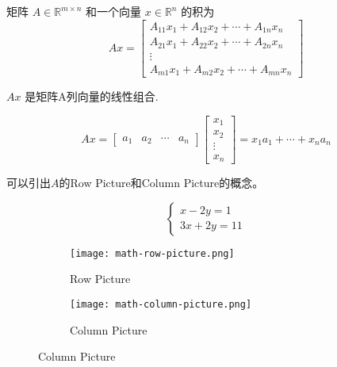 \begin{definition}[矩阵-向量乘积 $Ax$]
    矩阵 $ A \in \mathbb{R}^{m \times n} $ 和一个向量 $ x \in \mathbb{R}^{n} $ 的积为
$$
A x=\left[\begin{array}{c}
A_{11} x_{1}+A_{12} x_{2}+\cdots+A_{1 n} x_{n} \\
A_{21} x_{1}+A_{22} x_{2}+\cdots+A_{2 n} x_{n} \\
\vdots \\
A_{m 1} x_{1}+A_{m 2} x_{2}+\cdots+A_{m n} x_{n}
\end{array}\right]
$$
\end{definition}

\begin{corollary}
    $ {A} x $ 是矩阵A列向量的线性组合.

$$
A x=\left[\begin{array}{llll}
a_{1} & a_{2} & \cdots & a_{n}
\end{array}\right]\left[\begin{array}{c}
x_{1} \\
x_{2} \\
\vdots \\
x_{n}
\end{array}\right]=x_{1} a_{1}+\cdots+x_{n} a_{n}
$$
\end{corollary}

可以引出$A$的Row Picture和Column Picture的概念。

\begin{example}
    \label{exm: row-column-picture}
    $$\left\{\begin{matrix} 
        
        x - 2y=1 \\  
        3x+2y=11 
      \end{matrix}\right. $$




   
\begin{figure}[htbp]
        \caption{Row Picture and Column Picture for \ref{exm: row-column-picture}}
    \begin{subfigure}[b]{0.8\textwidth}
        \centering
        \caption{Row Picture}
    \texttt{[image: math-row-picture.png]}
    \end{subfigure}

   
    \begin{subfigure}[b]{0.8\textwidth}
        \centering
        \caption{Column Picture}
    \texttt{[image: math-column-picture.png]}
    \end{subfigure}
\end{figure}
\end{example}

